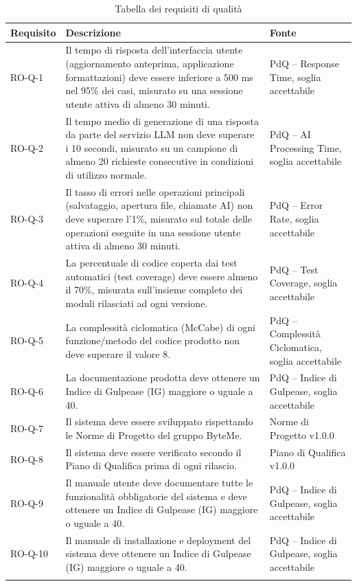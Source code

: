 \documentclass[11pt,a4paper]{article}
\begin{document}
\begin{longtable}{|p{}|>{\raggedright\arraybackslash}
  p{}|p{}|}
\hline
\textbf{Requisito} & \textbf{Descrizione} & \textbf{Fonte} \\
\hline
RO-Q-1 & Il tempo di risposta dell'interfaccia utente (aggiornamento anteprima, applicazione formattazioni) deve essere inferiore a 500 ms nel 95\% dei casi, misurato su una sessione utente attiva di almeno 30 minuti.  & PdQ – Response Time, soglia accettabile \\
\hline
RO-Q-2 & Il tempo medio di generazione di una risposta da parte del servizio LLM non deve superare i 10 secondi, misurato su un campione di almeno 20 richieste consecutive in condizioni di utilizzo normale.  & PdQ – AI Processing Time, soglia accettabile \\
\hline
RO-Q-3 & Il tasso di errori nelle operazioni principali (salvataggio, apertura file, chiamate AI) non deve superare l'1\%, misurato sul totale delle operazioni eseguite in una sessione utente attiva di almeno 30 minuti. & PdQ – Error Rate, soglia accettabile \\
\hline
RO-Q-4 & La percentuale di codice coperta dai test automatici (test coverage) deve essere almeno il 70\%, misurata sull'insieme completo dei moduli rilasciati ad ogni versione. & PdQ – Test Coverage, soglia accettabile \\
\hline
RO-Q-5 & La complessità ciclomatica (McCabe) di ogni funzione/metodo del codice prodotto non deve superare il valore 8. & PdQ – Complessità Ciclomatica, soglia accettabile \\
\hline
RO-Q-6 & La documentazione prodotta deve ottenere un Indice di Gulpease (IG) maggiore o uguale a 40. & PdQ – Indice di Gulpease, soglia accettabile \\
\hline
RO-Q-7 & Il sistema deve essere sviluppato rispettando le Norme 
di Progetto del gruppo ByteMe. & Norme di Progetto v1.0.0 \\
\hline
RO-Q-8 & Il sistema deve essere verificato secondo il Piano di Qualifica prima di ogni rilascio. & Piano di Qualifica v1.0.0 \\
\hline
RO-Q-9 & Il manuale utente deve documentare tutte le funzionalità obbligatorie del sistema e deve ottenere un Indice di Gulpease (IG) maggiore o uguale a 40. & PdQ – Indice di Gulpease, soglia accettabile \\
\hline
RO-Q-10 & Il manuale di installazione e deployment del sistema deve ottenere un Indice di Gulpease (IG) maggiore o uguale a 40. & PdQ – Indice di Gulpease, soglia accettabile \\
\hline
\addlinespace[1em]
\caption{Tabella dei requisiti di qualità}
\end{longtable}
\end{document}
